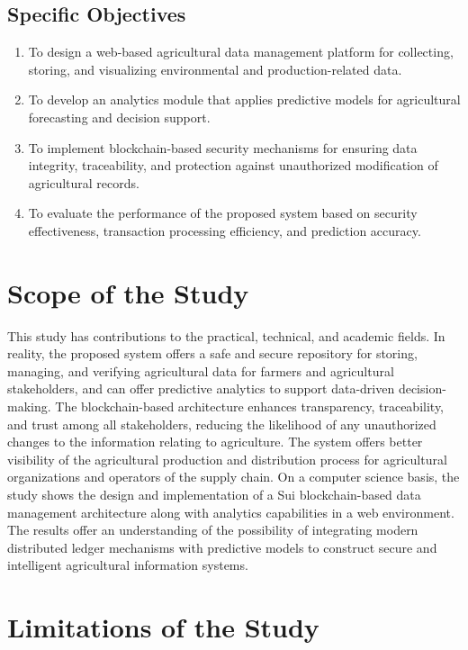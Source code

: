 \subsection{Specific Objectives}
\begin{enumerate}
    \item[i.] To design a web-based agricultural data management platform for collecting, storing, and visualizing environmental and production-related data.
    \item[ii.] To develop an analytics module that applies predictive models for agricultural forecasting and decision support.
    \item[iii.] To implement blockchain-based security mechanisms for ensuring data integrity, traceability, and protection against unauthorized modification of agricultural records.
    \item[iv.] To evaluate the performance of the proposed system based on security effectiveness, transaction processing efficiency, and prediction accuracy.
\end{enumerate}

\section{Scope of the Study}

This study has contributions to the practical, technical, and academic fields. In reality, the proposed system offers a safe and secure repository for storing, managing, and verifying agricultural data for farmers and agricultural stakeholders, and can offer predictive analytics to support data-driven decision-making. The blockchain-based architecture enhances transparency, traceability, and trust among all stakeholders, reducing the likelihood of any unauthorized changes to the information relating to agriculture. The system offers better visibility of the agricultural production and distribution process for agricultural organizations and operators of the supply chain. On a computer science basis, the study shows the design and implementation of a Sui blockchain-based data management architecture along with analytics capabilities in a web environment. The results offer an understanding of the possibility of integrating modern distributed ledger mechanisms with predictive models to construct secure and intelligent agricultural information systems.

\section{Limitations of the Study}

